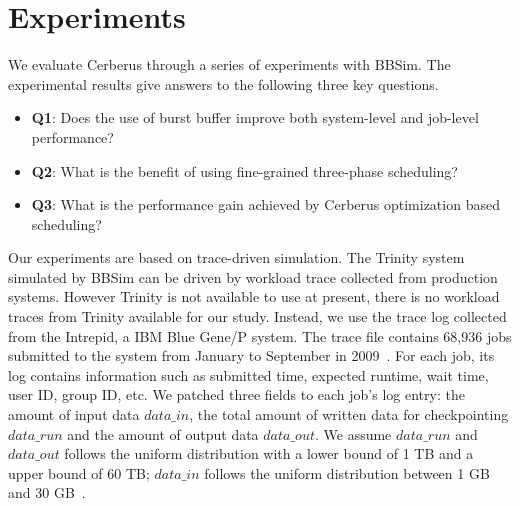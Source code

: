 \section{Experiments}
\label{Sec:Experiments}


We evaluate Cerberus through a series of experiments with BBSim.
The experimental results give answers to the following three key questions.
\begin{itemize}
        \item \textbf{Q1}: Does the use of burst buffer 
        improve both system-level and job-level performance?
        \item \textbf{Q2}: What is the benefit of using 
        fine-grained three-phase scheduling?
        \item \textbf{Q3}: What is the performance gain achieved 
        by Cerberus optimization based scheduling?
\end{itemize}

Our experiments are based on trace-driven simulation.
The Trinity system simulated by BBSim can be driven 
by workload trace collected from production systems.
However Trinity is not available to use at present, 
there is no workload traces from Trinity available for our study.
Instead, we use the trace log collected from the Intrepid, a IBM Blue Gene/P system. 
The trace file contains 68,936 jobs
submitted to the system from January to September in 2009~\cite{Tang:IPDPS:2010}.
For each job, its log contains information such as submitted time, expected runtime, wait time, user ID, group ID, etc.
We patched three fields to each job's log entry: the amount of input data $data\_in$,
the total amount of written data for checkpointing $data\_run$
and the amount of output data $data\_out$.
We assume $data\_run$ and $data\_out$ follows the uniform distribution with a
lower bound of 1 TB and a upper bound of 60 TB;
$data\_in$ follows the uniform distribution between 1 GB and 30 GB~\cite{Liu:MSST:2012}.

